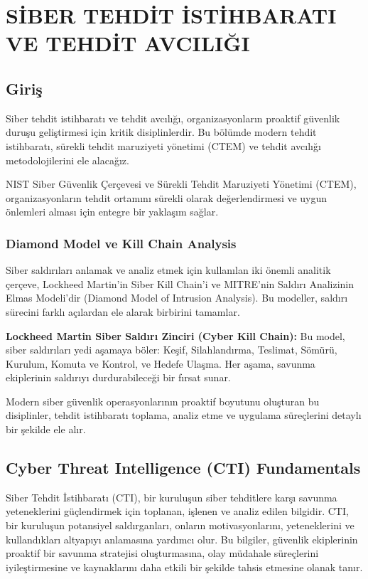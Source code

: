 \chapter{SİBER TEHDİT İSTİHBARATI VE TEHDİT AVCILIĞI}

\section*{Giriş}
Siber tehdit istihbaratı ve tehdit avcılığı, organizasyonların proaktif güvenlik duruşu geliştirmesi için kritik disiplinlerdir. Bu bölümde modern tehdit istihbaratı, sürekli tehdit maruziyeti yönetimi (CTEM) ve tehdit avcılığı metodolojilerini ele alacağız.

NIST Siber Güvenlik Çerçevesi ve Sürekli Tehdit Maruziyeti Yönetimi (CTEM), organizasyonların tehdit ortamını sürekli olarak değerlendirmesi ve uygun önlemleri alması için entegre bir yaklaşım sağlar.

\subsection{Diamond Model ve Kill Chain Analysis}

Siber saldırıları anlamak ve analiz etmek için kullanılan iki önemli analitik çerçeve, Lockheed Martin'in Siber Kill Chain'i ve MITRE'nin Saldırı Analizinin Elmas Modeli'dir (Diamond Model of Intrusion Analysis). Bu modeller, saldırı sürecini farklı açılardan ele alarak birbirini tamamlar.

\textbf{Lockheed Martin Siber Saldırı Zinciri (Cyber Kill Chain):} Bu model, siber saldırıları yedi aşamaya böler: Keşif, Silahlandırma, Teslimat, Sömürü, Kurulum, Komuta ve Kontrol, ve Hedefe Ulaşma. Her aşama, savunma ekiplerinin saldırıyı durdurabileceği bir fırsat sunar.

Modern siber güvenlik operasyonlarının proaktif boyutunu oluşturan bu disiplinler, tehdit istihbaratı toplama, analiz etme ve uygulama süreçlerini detaylı bir şekilde ele alır.

\section{Cyber Threat Intelligence (CTI) Fundamentals}
Siber Tehdit İstihbaratı (CTI), bir kuruluşun siber tehditlere karşı savunma yeteneklerini güçlendirmek için toplanan, işlenen ve analiz edilen bilgidir. CTI, bir kuruluşun potansiyel saldırganları, onların motivasyonlarını, yeteneklerini ve kullandıkları altyapıyı anlamasına yardımcı olur. Bu bilgiler, güvenlik ekiplerinin proaktif bir savunma stratejisi oluşturmasına, olay müdahale süreçlerini iyileştirmesine ve kaynaklarını daha etkili bir şekilde tahsis etmesine olanak tanır.

